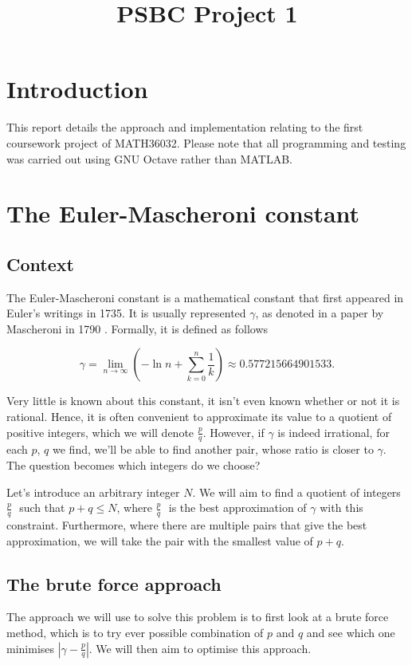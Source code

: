\documentclass[10pt]{article}
\title{PSBC Project 1}
\newcommand*{\gam}{$\gamma$}
\newcommand*{\pdivq}{$\frac{p}{q} \text{ }$}
\newcommand{\inlinemaketitle}{{\let\newpage\relax\maketitle}}
\begin{document}
\inlinemaketitle
\section{Introduction}

This report details the approach and implementation relating to the first coursework project of MATH36032. Please note that all programming and testing was carried out using GNU Octave rather than MATLAB.
\section{The Euler-Mascheroni constant}

\subsection{Context}
The Euler-Mascheroni constant is a mathematical constant that first appeared in Euler's writings in 1735. It is usually represented \gam, as denoted in a paper by Mascheroni in 1790 \cite{eulerconst}. Formally, it is defined as follows

\begin{equation}
\gamma = \lim_{n \to \infty}  \left( -\ln{n} + \sum_{k=0}^{n} \frac{1}{k}  \right) \approx 0.577215664901533.
\end{equation}

Very little is known about this constant, it isn't even known whether or not it is rational. Hence, it is often convenient to approximate its value to a quotient of positive integers, which we will denote $ \frac{p}{q}$. However, if $\gamma$ is indeed irrational, for each $p$, $q$ we find, we'll be able to find another pair, whose ratio is closer to \gam. The question becomes which integers do we choose?

Let's introduce an arbitrary integer $N$. We will aim to find a quotient of integers \pdivq such that $p + q \leq N$, where \pdivq is the best approximation of $\gamma$ with this constraint. Furthermore, where there are multiple pairs that give the best approximation, we will take the pair with the smallest value of $p+q$.

\subsection{The brute force approach}

The approach we will use to solve this problem is to first look at a brute force method, which is to try ever possible combination of $p$ and $q$ and see which one minimises $ | \gamma - \frac{p}{q} |$. We will then aim to optimise this approach.
\end{document}
